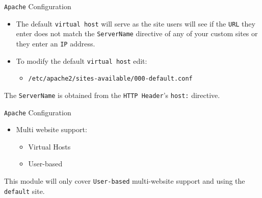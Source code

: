 \documentclass[xcolor=table]{beamer}
\begin{document}
\begin{frame}{\texttt{Apache} Configuration}
  \begin{itemize}
    \item The default \texttt{virtual host} will serve as the site users will see if the \texttt{URL} they enter does not match the \texttt{ServerName} directive of any of your custom sites or they enter an \texttt{IP} address. 
    \item To modify the default \texttt{virtual host} edit:
      \begin{itemize}
        \item \texttt{/etc/apache2/sites-available/000-default.conf}
      \end{itemize}
  \end{itemize}
  \begin{tcolorbox}
    \begin{center}
      \scriptsize The \texttt{ServerName} is obtained from the \texttt{HTTP Header}'s \texttt{host:} directive.
    \end{center}
  \end{tcolorbox}
\end{frame}

\begin{frame}{\texttt{Apache} Configuration}
  \begin{itemize}
    \item Multi website support:
      \begin{itemize}
        \item Virtual Hosts
        \item User-based
      \end{itemize}
  \end{itemize}
  \begin{tcolorbox}
    \begin{center}
      \scriptsize This module will only cover \texttt{User-based} multi-website support and using the \texttt{default} site.
    \end{center}
  \end{tcolorbox}
\end{frame}
\end{document}
